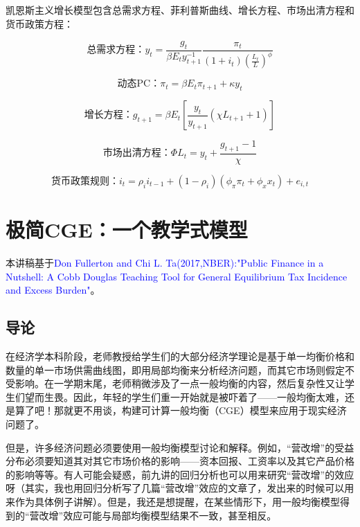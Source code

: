 \documentclass[cn,12pt,math=newtx,citestyle=gb7714-2015,bibstyle=gb7714-2015]{elegantbook}
\begin{document}
	凯恩斯主义增长模型包含总需求方程、菲利普斯曲线、增长方程、市场出清方程和货币政策方程：
	
		\begin{equation}
		\text{总需求方程：} y_t =\frac{g_t}{\beta E_t y_{t+1}^{-1}}\frac{\pi_t}{(1+i_t)\left(\frac{L_t}{L}\right)^\phi}
	\end{equation}

	\begin{equation}
	\text{动态PC：}\pi_t =\beta E_t \pi_{t+1} + \kappa y_t
\end{equation}

	\begin{equation}
	\text{增长方程：} g_{t+1} =\beta E_t \left[\frac{y_t}{y_{t+1}}(\chi L_{t+1}+1)\right]
\end{equation}

	\begin{equation}
	\text{市场出清方程：}\Phi L_t = y_t + \frac{g_{t+1}-1}{\chi}
\end{equation}
	
		\begin{equation}
		\text{货币政策规则：} i_t =\rho_i i_{t-1} + (1-\rho_i)(\phi_\pi \pi_{t} + \phi_x x_t) + e_{i,t}
	\end{equation}
	
	
	
	
	
	\chapter{极简CGE：一个教学式模型}
	
	
	
		本讲稿基于\textcolor{blue}{Don Fullerton and Chi L. Ta(2017,NBER):"Public Finance in a Nutshell: A Cobb Douglas Teaching Tool for General Equilibrium Tax Incidence and Excess Burden"}。
	
	
	
	
	\section{导论}
	在经济学本科阶段，老师教授给学生们的大部分经济学理论是基于单一均衡价格和数量的单一市场供需曲线图，即用局部均衡来分析经济问题，而其它市场则假定不受影响。在一学期末尾，老师稍微涉及了一点一般均衡的内容，然后复杂性又让学生们望而生畏。因此，年轻的学生们重一开始就是被吓着了——一般均衡太难，还是算了吧！那就更不用谈，构建可计算一般均衡（CGE）模型来应用于现实经济问题了。
	
	但是，许多经济问题必须要使用一般均衡模型讨论和解释。例如，“营改增”的受益分布必须要知道其对其它市场价格的影响——资本回报、工资率以及其它产品价格的影响等等。有人可能会疑惑，前九讲的回归分析也可以用来研究“营改增”的效应呀（其实，我也用回归分析写了几篇“营改增”效应的文章了，发出来的时候可以用来作为具体例子讲解）。但是，我还是想提醒，在某些情形下，用一般均衡模型得到的“营改增”效应可能与局部均衡模型结果不一致，甚至相反。
	
\end{document}
